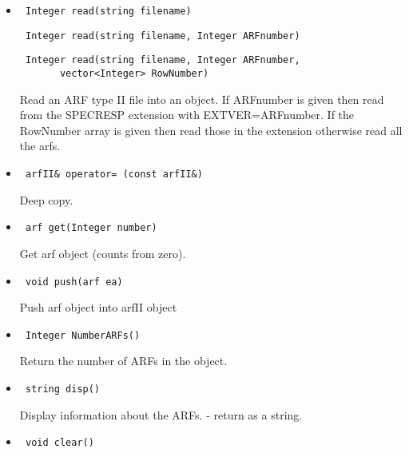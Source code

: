 \documentclass[11pt]{book}
\begin{document}
\begin{itemize}

\item  \begin{verbatim} Integer read(string filename) \end{verbatim}
       \begin{verbatim} Integer read(string filename, Integer ARFnumber) \end{verbatim}
       \begin{verbatim} Integer read(string filename, Integer ARFnumber, 
       vector<Integer> RowNumber) \end{verbatim}

           Read an ARF type II file into an object. If ARFnumber is
           given then read from the SPECRESP extension with EXTVER=ARFnumber.
           If the RowNumber array is given then read those in the 
           extension otherwise read all the arfs.

\item  \begin{verbatim} arfII& operator= (const arfII&) \end{verbatim}

           Deep copy.

\item  \begin{verbatim} arf get(Integer number) \end{verbatim}

           Get arf object (counts from zero).

\item  \begin{verbatim} void push(arf ea) \end{verbatim}

           Push arf object into arfII object

\item  \begin{verbatim} Integer NumberARFs() \end{verbatim}

           Return the number of ARFs in the object.

\item    \begin{verbatim} string disp() \end{verbatim}

           Display information about the ARFs. - return as a string.

\item    \begin{verbatim} void clear() \end{verbatim}


\end{itemize}
\end{document}
